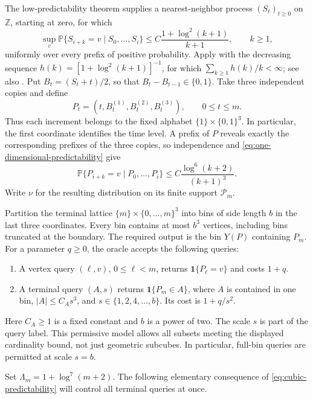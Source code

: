\documentclass[11pt,a4paper]{article}
\newcommand{\Prb}{\mathbb P}
\newcommand{\one}{\mathbf 1}
\theoremstyle{definition}
\theoremstyle{remark}
\begin{document}
The low-predictability theorem supplies a nearest-neighbor process
$(S_t)_{t\ge0}$ on $\mathbb Z$, starting at zero, for which
\begin{equation}
 \sup_{v}\Prb\{S_{i+k}=v\mid S_0,\ldots,S_i\}
 \le C\frac{1+\log^2(k+1)}{k+1},\qquad k\ge1,
 \label{eq:one-dimensional-predictability}
\end{equation}
uniformly over every prefix of positive probability.  Apply
\cite[Theorem~1.4]{haggstrom1998} with the decreasing sequence
$h(k)=[1+\log^2(k+1)]^{-1}$, for which
$\sum_{k\ge1}h(k)/k<\infty$; see also
\cite[Theorem~18]{bubeck2020}.  Put $B_t=(S_t+t)/2$, so that
$B_t-B_{t-1}\in\{0,1\}$.  Take three independent copies and define
\[
 P_t=(t,B_t^{(1)},B_t^{(2)},B_t^{(3)}),\qquad 0\le t\le m.
\]
Thus each increment belongs to the fixed alphabet
$\{1\}\times\{0,1\}^3$.  In particular, the first coordinate identifies the
time level.  A prefix of $P$ reveals exactly the corresponding prefixes of
the three copies, so independence and
\eqref{eq:one-dimensional-predictability} give
\begin{equation}
 \Prb\{P_{i+k}=v\mid P_0,\ldots,P_i\}
 \le C\frac{\log^6(k+2)}{(k+1)^3}.
 \label{eq:cubic-predictability}
\end{equation}
Write $\nu$ for the resulting distribution on its finite support
$\mathcal P_m$.

Partition the terminal lattice $\{m\}\times\{0,\ldots,m\}^3$ into bins of
side length $b$ in the last three coordinates.  Every bin contains at most
$b^3$ vertices, including bins truncated at the boundary.  The required
output is the bin $Y(P)$ containing $P_m$.
For a parameter $q\ge0$, the oracle accepts the following queries:
\begin{enumerate}
 \item A vertex query $(\ell,v)$, $0\le\ell<m$, returns
 $\one\{P_\ell=v\}$ and costs $1+q$.
 \item A terminal query $(A,s)$ returns $\one\{P_m\in A\}$, where $A$ is
 contained in one bin, $|A|\le C_A s^3$, and
 $s\in\{1,2,4,\ldots,b\}$.  Its cost is $1+q/s^2$.
\end{enumerate}
Here $C_A\ge1$ is a fixed constant and $b$ is a power of two.  The scale
$s$ is part of the query label.  This permissive model allows all subsets
meeting the displayed cardinality bound, not just geometric subcubes.
In particular, full-bin queries are permitted at scale $s=b$.

Set $\Lambda_m=1+\log^7(m+2)$.  The following elementary consequence of
\eqref{eq:cubic-predictability} will control all terminal queries at once.
\end{document}
